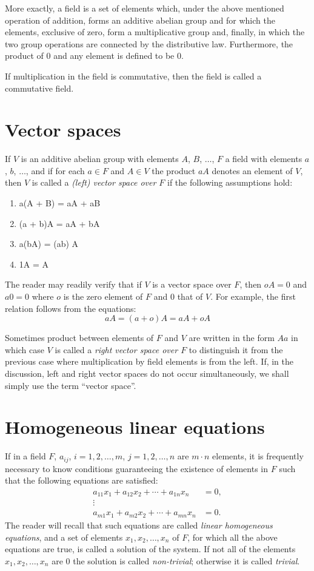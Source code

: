 \documentclass[10pt,leqno,a5paper]{book}
\theoremstyle{definition}
\let\htw\section
\begin{document}
More exactly, a field is a set of elements which, under the above mentioned operation of addition, forms an additive abel\-ian group and for which the elements, exclusive of zero, form a multiplicative group and, finally, in which the two group operations are connected by the distributive law.
Furthermore, the product of 0 and any element is defined to be 0.

If multiplication in the field is commutative, then the field is called a commutative field.


\htw{Vector spaces}

If $V$ is an additive abelian group with elements $A$, $B$, $\ldots$, $F$ a field with elements $a$, $b$, $\ldots$, and if for each $a \in F$ and $A \in V$ the product $aA$ denotes an element of $V$, then $V$ is called a \emph{(left) vector space over $F$} if the following assumptions hold:

\begin{enumerate}
\item
a(A + B) = aA + aB

\item
(a + b)A = aA + bA

\item
a(bA) = (ab) A

\item
1A = A
\end{enumerate}

The reader may readily verify that if $V$ is a vector space over $F$, then $oA = 0$ and $a0 = 0$ where $o$ is the zero element of $F$ and $0$ that of $V$.
For example, the first relation follows from the equations:
\[
aA = (a + o)A = aA + oA
\]

Sometimes product between elements of $F$ and $V$ are written in the form $Aa$ in which case $V$ is called a \emph{right vector space over $F$} to distinguish it from the previous case where multiplication by field elements is from the left.
If, in the discussion, left and right vector spaces do not occur simultaneously, we shall simply use the term ``vector space''.


\htw{Homogeneous linear equations}

If in a field $F$, $a_{ij}$, $i = 1,2,\ldots,m$, $j = 1,2,\ldots,n$ are $m \cdot n$ elements, it is frequently necessary to know conditions guaranteeing the existence of elements in $F$ such that the following equations are satisfied:
\begin{equation}
\label{eq:on}
\begin{aligned}
a_{11} x_1 + a_{12} x_2 + \cdots + a_{1n} x_n &= 0,
\\
\vdots &
\\
a_{m1} x_1 + a_{m2} x_2 + \cdots + a_{mn} x_n &= 0.
\end{aligned}
\end{equation}
The reader will recall that such equations are called \emph{linear homogeneous equations}, and a set of elements $x_1, x_2, \ldots, x_n$ of $F$, for which all the above equations are true, is called a solution of the system.
If not all of the elements $x_1, x_2, \ldots, x_n$ are $0$ the solution is called \emph{non-trivial}; otherwise it is called \emph{trivial}.
\end{document}
